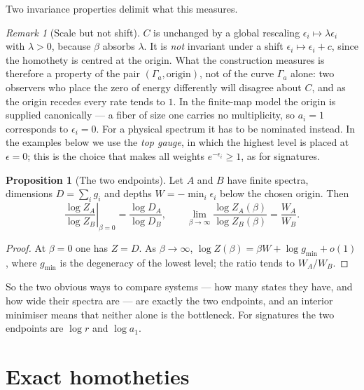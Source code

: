 \documentclass[11pt]{article}
\theoremstyle{definition}
\newtheorem{proposition}{Proposition}
\theoremstyle{remark}
\newtheorem{remark}{Remark}
\begin{document}
Two invariance properties delimit what this measures.

\begin{remark}[Scale but not shift]
\label{rem:gauge}
\(C\) is unchanged by a global rescaling \(\epsilon_i\mapsto\lambda\epsilon_i\)
with \(\lambda>0\), because \(\beta\) absorbs \(\lambda\).  It is \emph{not}
invariant under a shift \(\epsilon_i\mapsto\epsilon_i+c\), since the homothety
is centred at the origin.  What the construction measures is therefore a
property of the pair \((\Gamma_a,\text{origin})\), not of the curve
\(\Gamma_a\) alone: two observers who place the zero of energy differently
will disagree about \(C\), and as the origin recedes every rate tends to
\(1\).  In the finite-map model the origin is supplied canonically --- a fiber
of size one carries no multiplicity, so \(a_i=1\) corresponds to
\(\epsilon_i=0\).  For a physical spectrum it has to be nominated instead.  In the
examples below we use the \emph{top gauge}, in which the highest level is placed at \(\epsilon=0\); this
is the choice that makes all weights \(e^{-\epsilon_i}\geq1\), as for
signatures.
\end{remark}

\begin{proposition}[The two endpoints]
\label{prop:endpoints}
Let \(A\) and \(B\) have finite spectra, dimensions
\(D=\sum_i g_i\) and depths \(W=-\min_i\epsilon_i\) below the chosen origin.
Then
\[
  \left.\frac{\log Z_A}{\log Z_B}\right|_{\beta=0}
  =\frac{\log D_A}{\log D_B},
  \qquad
  \lim_{\beta\to\infty}\frac{\log Z_A(\beta)}{\log Z_B(\beta)}
  =\frac{W_A}{W_B}.
\]
\end{proposition}

\begin{proof}
At \(\beta=0\) one has \(Z=D\).  As \(\beta\to\infty\),
\(\log Z(\beta)=\beta W+\log g_{\min}+o(1)\), where \(g_{\min}\) is the
degeneracy of the lowest level; the ratio tends to \(W_A/W_B\).
\end{proof}

So the two obvious ways to compare systems --- how many states they have, and
how wide their spectra are --- are exactly the two endpoints, and an interior
minimiser means that neither alone is the bottleneck.  For signatures the two
endpoints are \(\log r\) and \(\log a_1\).

\section{Exact homotheties}
\label{sec:exact-homotheties}
\end{document}
